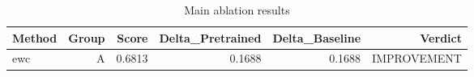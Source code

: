 \begin{table}[htbp]
\centering
\caption{Main ablation results}
\label{tab:main-results}
\begin{tabular}{lrrrrr}
\toprule
\textbf{Method} & \textbf{Group} & \textbf{Score} & \textbf{Delta\_Pretrained} & \textbf{Delta\_Baseline} & \textbf{Verdict} \\
\midrule
ewc & A & 0.6813 & 0.1688 & 0.1688 & IMPROVEMENT \\
\bottomrule
\end{tabular}
\end{table}